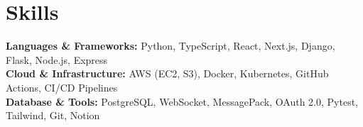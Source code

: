 \section{Skills}

\begin{onecolentry}
    \textbf{Languages \& Frameworks:} Python, TypeScript, React, Next.js, Django, Flask, Node.js, Express \\
    \textbf{Cloud \& Infrastructure:} AWS (EC2, S3), Docker, Kubernetes, GitHub Actions, CI/CD Pipelines \\
    \textbf{Database \& Tools:} PostgreSQL, WebSocket, MessagePack, OAuth 2.0, Pytest, Tailwind, Git, Notion
\end{onecolentry}
